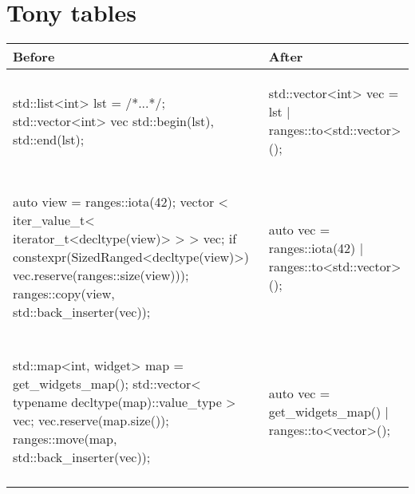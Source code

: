 \documentclass{wg21}
\begin{document}
\section{Tony tables}
\begin{center}
\begin{tabular}{l|l}
Before & After\\ \hline
\begin{minipage}[t]{0.5\textwidth}
\begin{colorblock}
std::list<int> lst = /*...*/;
std::vector<int> vec
	{std::begin(lst), std::end(lst)};
\end{colorblock}
\end{minipage}
&
\begin{minipage}[t]{0.5\textwidth}
\begin{colorblock}
std::vector<int> vec = lst | ranges::to<std::vector>();
\end{colorblock}
\end{minipage}
\\\\ \hline

\begin{minipage}[t]{0.5\textwidth}
\begin{colorblock}
auto view = ranges::iota(42);
vector <
  iter_value_t<
	iterator_t<decltype(view)>
  >
> vec;
if constexpr(SizedRanged<decltype(view)>) {
  vec.reserve(ranges::size(view)));
}
ranges::copy(view, std::back_inserter(vec));
\end{colorblock}
\end{minipage}
&
\begin{minipage}[t]{0.5\textwidth}
\begin{colorblock}
auto vec = ranges::iota(42)
	| ranges::to<std::vector>();
\end{colorblock}
\end{minipage}
\\\\ \hline


\begin{minipage}[t]{0.5\textwidth}
\begin{colorblock}
std::map<int, widget> map = get_widgets_map();
std::vector<
  typename decltype(map)::value_type
> vec;
vec.reserve(map.size());
ranges::move(map, std::back_inserter(vec));
\end{colorblock}
\end{minipage}
&
\begin{minipage}[t]{0.5\textwidth}
\begin{colorblock}
auto vec = get_widgets_map()
          | ranges::to<vector>();
\end{colorblock}
\end{minipage}
\\\\ \hline

\end{tabular}
\end{center}
\end{document}
